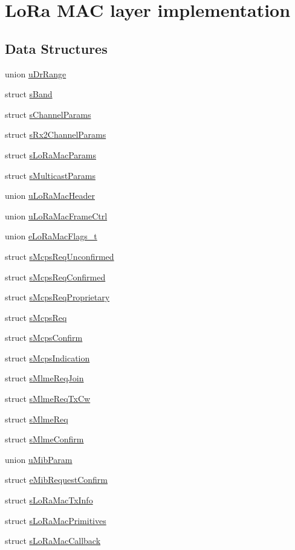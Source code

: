 \hypertarget{group__LORAMAC}{}\section{Lo\+Ra M\+AC layer implementation}
\label{group__LORAMAC}
\subsection*{Data Structures}
\begin{DoxyCompactItemize}
\item 
union \hyperlink{unionuDrRange}{u\+Dr\+Range}
\item 
struct \hyperlink{structsBand}{s\+Band}
\item 
struct \hyperlink{structsChannelParams}{s\+Channel\+Params}
\item 
struct \hyperlink{structsRx2ChannelParams}{s\+Rx2\+Channel\+Params}
\item 
struct \hyperlink{structsLoRaMacParams}{s\+Lo\+Ra\+Mac\+Params}
\item 
struct \hyperlink{structsMulticastParams}{s\+Multicast\+Params}
\item 
union \hyperlink{unionuLoRaMacHeader}{u\+Lo\+Ra\+Mac\+Header}
\item 
union \hyperlink{unionuLoRaMacFrameCtrl}{u\+Lo\+Ra\+Mac\+Frame\+Ctrl}
\item 
union \hyperlink{unioneLoRaMacFlags__t}{e\+Lo\+Ra\+Mac\+Flags\+\_\+t}
\item 
struct \hyperlink{structsMcpsReqUnconfirmed}{s\+Mcps\+Req\+Unconfirmed}
\item 
struct \hyperlink{structsMcpsReqConfirmed}{s\+Mcps\+Req\+Confirmed}
\item 
struct \hyperlink{structsMcpsReqProprietary}{s\+Mcps\+Req\+Proprietary}
\item 
struct \hyperlink{structsMcpsReq}{s\+Mcps\+Req}
\item 
struct \hyperlink{structsMcpsConfirm}{s\+Mcps\+Confirm}
\item 
struct \hyperlink{structsMcpsIndication}{s\+Mcps\+Indication}
\item 
struct \hyperlink{structsMlmeReqJoin}{s\+Mlme\+Req\+Join}
\item 
struct \hyperlink{structsMlmeReqTxCw}{s\+Mlme\+Req\+Tx\+Cw}
\item 
struct \hyperlink{structsMlmeReq}{s\+Mlme\+Req}
\item 
struct \hyperlink{structsMlmeConfirm}{s\+Mlme\+Confirm}
\item 
union \hyperlink{unionuMibParam}{u\+Mib\+Param}
\item 
struct \hyperlink{structeMibRequestConfirm}{e\+Mib\+Request\+Confirm}
\item 
struct \hyperlink{structsLoRaMacTxInfo}{s\+Lo\+Ra\+Mac\+Tx\+Info}
\item 
struct \hyperlink{structsLoRaMacPrimitives}{s\+Lo\+Ra\+Mac\+Primitives}
\item 
struct \hyperlink{structsLoRaMacCallback}{s\+Lo\+Ra\+Mac\+Callback}
\end{DoxyCompactItemize}
